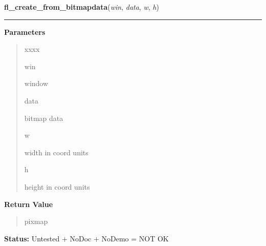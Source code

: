     \label{xformslib:library:fl_create_from_bitmapdata}

    \vspace{0.5ex}

\hspace{.8\funcindent}\begin{boxedminipage}{\funcwidth}

    \raggedright \textbf{fl\_create\_from\_bitmapdata}(\textit{win}, \textit{data}, \textit{w}, \textit{h})

    \vspace{-1.5ex}

    \rule{\textwidth}{0.5\fboxrule}
\setlength{\parskip}{2ex}
\setlength{\parskip}{1ex}
      \textbf{Parameters}
      \vspace{-1ex}

      \begin{quote}
        \begin{Ventry}{xxxx}

          \item[win]

          window

          \item[data]

          bitmap data

          \item[w]

          width in coord units

          \item[h]

          height in coord units

        \end{Ventry}

      \end{quote}

      \textbf{Return Value}
    \vspace{-1ex}

      \begin{quote}
      pixmap

      \end{quote}

\textbf{Status:} Untested + NoDoc + NoDemo = NOT OK



    \end{boxedminipage}

